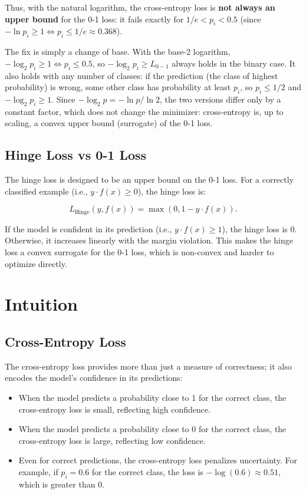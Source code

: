 \begin{notechapter}
Thus, with the natural logarithm, the cross-entropy loss is \textbf{not always an upper bound}
for the 0-1 loss: it fails exactly for \( 1/e < p_i < 0.5 \) (since \( -\ln p_i \geq 1 \iff p_i \leq 1/e \approx 0.368 \)).

The fix is simply a change of base. With the base-2 logarithm, \( -\log_2 p_i \geq 1 \iff p_i \leq 0.5 \),
so \( -\log_2 p_i \geq L_{0-1} \) always holds in the binary case. It also holds with any number of classes:
if the prediction (the class of highest probability) is wrong, some other class has probability at least
\( p_i \), so \( p_i \leq 1/2 \) and \( -\log_2 p_i \geq 1 \). Since \( -\log_2 p = -\ln p / \ln 2 \), the two versions differ
only by a constant factor, which does not change the minimizer: cross-entropy is, up to scaling, a
convex upper bound (surrogate) of the 0-1 loss.

\subsection{Hinge Loss vs 0-1 Loss}
The hinge loss is designed to be an upper bound on the 0-1 loss. For 
a correctly classified example (i.e., \( y \cdot f(x) \geq 0 \)), the 
hinge loss is:

\[
L_{\text{Hinge}}(y, f(x)) = \max(0, 1 - y \cdot f(x)).
\]

If the model is confident in its prediction (i.e., \( y \cdot f(x) \geq 1 \)), 
the hinge loss is 0. Otherwise, it increases linearly with the margin 
violation. This makes the hinge loss a convex surrogate for the 0-1 
loss, which is non-convex and harder to optimize directly.

\section{Intuition}

\subsection{Cross-Entropy Loss}
The cross-entropy loss provides more than just a measure of correctness; 
it also encodes the model's confidence in its predictions:

\begin{itemize}
    \item When the model predicts a probability close to 1 for the 
          correct class, the cross-entropy loss is small, reflecting 
          high confidence.
    \item When the model predicts a probability close to 0 for the 
          correct class, the cross-entropy loss is large, reflecting 
          low confidence.
    \item Even for correct predictions, the cross-entropy loss penalizes 
          uncertainty. For example, if \( p_i = 0.6 \) for the correct 
          class, the loss is \( -\log(0.6) \approx 0.51 \), which is 
          greater than 0.
\end{itemize}


\end{notechapter}
